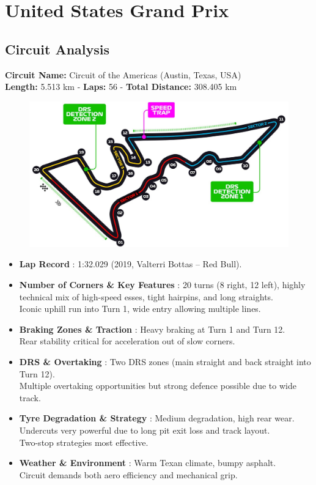 \section{United States Grand Prix}

\subsection{Circuit Analysis}

\textbf{Circuit Name:} Circuit of the Americas (Austin, Texas, USA) \\
\textbf{Length:} 5.513 km - \textbf{Laps:} 56 - \textbf{Total Distance:} 308.405 km

\begin{figure}[H]
    \centering
    \includegraphics[width=0.75\linewidth]{images/19.United_States_Circuit.jpg}
\end{figure}

\begin{itemize}
    \item \textbf{Lap Record} : 1:32.029 (2019, Valterri Bottas – Red Bull).
    
    \item \textbf{Number of Corners \& Key Features} : 20 turns (8 right, 12 left), highly technical mix of high-speed esses, tight hairpins, and long straights. \\
    Iconic uphill run into Turn 1, wide entry allowing multiple lines. 
    
    \item \textbf{Braking Zones \& Traction} : Heavy braking at Turn 1 and Turn 12. \\
    Rear stability critical for acceleration out of slow corners.
    
    \item \textbf{DRS \& Overtaking} : Two DRS zones (main straight and back straight into Turn 12). \\
    Multiple overtaking opportunities but strong defence possible due to wide track.
    
    \item \textbf{Tyre Degradation \& Strategy} : Medium degradation, high rear wear. \\
    Undercuts very powerful due to long pit exit loss and track layout. \\
    Two-stop strategies most effective.
    
    \item \textbf{Weather \& Environment} : Warm Texan climate, bumpy asphalt. \\
    Circuit demands both aero efficiency and mechanical grip.
\end{itemize}

